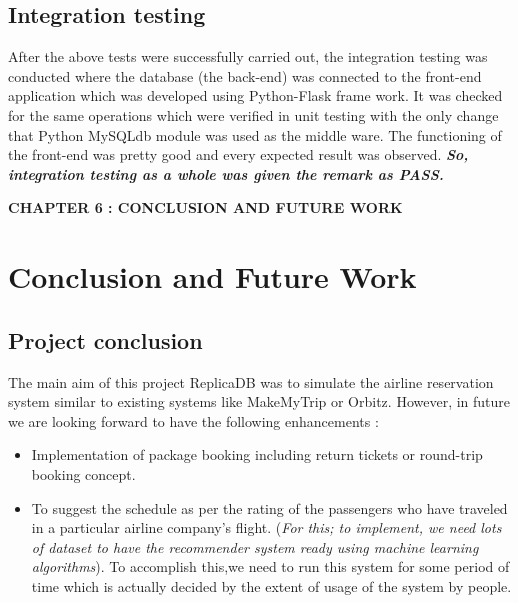 \documentclass[hidelinks=true]{article}
\begin{document}
\subsection{Integration testing}
After the above tests were successfully carried out, the integration testing was conducted where the database (the back-end) was connected to the front-end application which was developed using Python-Flask frame work. It was checked for the same operations which were verified in unit testing with the only change that Python MySQLdb module was used as the middle ware. The functioning of the front-end was pretty good and every expected result was observed. \textbf{\emph{So, integration testing as a whole was given the remark as PASS.}}

\pagebreak
\begin{center}
\vspace*{\fill}
\LARGE{\textbf{CHAPTER 6 : CONCLUSION AND FUTURE WORK}}
\vspace*{\fill}
\pagebreak
\end{center}

\section{Conclusion and Future Work}
\subsection{Project conclusion}
The main aim of this project ReplicaDB was to simulate the airline reservation system similar to existing systems like MakeMyTrip or Orbitz. 
However, in future we are looking forward to have the following enhancements :

\begin{itemize}
\item Implementation of package booking including return tickets or round-trip booking concept.
\item To suggest the schedule as per the rating of the passengers who have traveled in a particular airline company's flight. (\emph{For this; to implement, we need lots of dataset to have the recommender system ready using machine learning algorithms}). To accomplish this,we need to run this system for some period of time which is actually decided by the extent of usage of the system by people.
\end{itemize}
\end{document}
